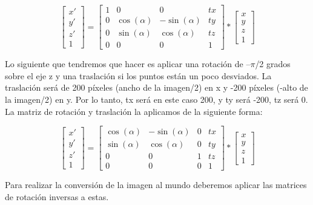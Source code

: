 \begin{equation}
\label{ec.matriz}
\left[\begin{array}{cc}
x' \\ 
y' \\
z' \\
1
\end{array}\right] = \left[\begin{array}{cccc}
1 & 0 & 0 & tx \\ 
0 & \cos(\alpha) & -\sin(\alpha) & ty\\
0 & \sin(\alpha) & \cos(\alpha) & tz \\
0 & 0 & 0 & 1
\end{array}\right]* \left[\begin{array}{cc}
x \\ 
y \\
z \\
1
\end{array}\right]
\end{equation}
 
Lo siguiente que tendremos que hacer es aplicar una rotación de –\(\pi\)/2 grados sobre el eje z y una traslación si los puntos están un poco desviados. La traslación será de 200 píxeles (ancho de la imagen/2) en x y -200 píxeles (-alto de la imagen/2) en y. Por lo tanto, tx será en este caso 200, y ty será -200, tz será 0. La matriz de rotación y traslación la aplicamos de la siguiente forma:

\begin{equation}
\left[\begin{array}{cc}
x' \\ 
y' \\
z' \\
1
\end{array}\right] = \left[\begin{array}{cccc}
\cos(\alpha) & -\sin(\alpha) & 0 & tx \\ 
\sin(\alpha) & \cos(\alpha) & 0 & ty\\
0 & 0 & 1 & tz \\
0 & 0 & 0 & 1
\end{array}\right]* \left[\begin{array}{cc}
x \\ 
y \\
z \\
1
\end{array}\right]
\end{equation}

Para realizar la conversión de la imagen al mundo deberemos aplicar las matrices de rotación inversas a estas. 

